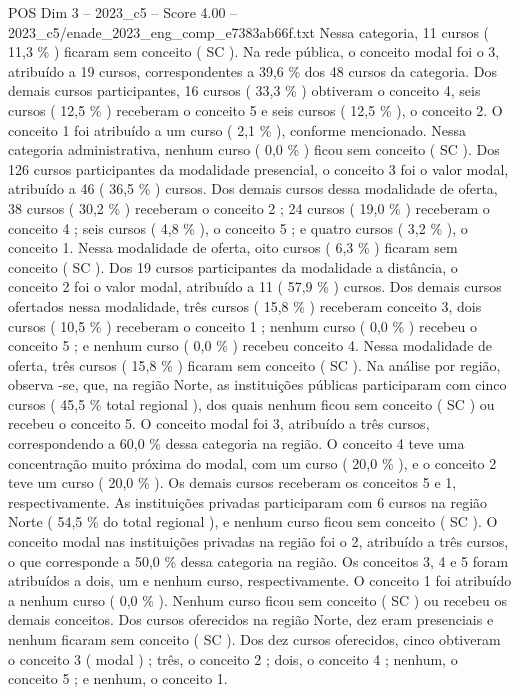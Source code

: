 \begin{textsample}{POS Dim 3 – 2023\_c5 – Score 4.00 – 2023\_c5/enade\_2023\_eng\_comp\_e7383ab66f.txt}
Nessa categoria, 11 cursos ( 11,3 \% ) ficaram sem conceito ( SC ).
Na rede pública, o conceito modal foi o 3, atribuído a 19 cursos, correspondentes a 39,6 \% dos 48 cursos da categoria.
Dos demais cursos participantes, 16 cursos ( 33,3 \% ) obtiveram o conceito 4, seis cursos ( 12,5 \% ) receberam o conceito 5 e seis cursos ( 12,5 \% ), o conceito 2.
O conceito 1 foi atribuído a um curso ( 2,1 \% ), conforme mencionado.
Nessa categoria administrativa, nenhum curso ( 0,0 \% ) ficou sem conceito ( SC ).
Dos 126 cursos participantes da modalidade presencial, o conceito 3 foi o valor modal, atribuído a 46 ( 36,5 \% ) cursos.
Dos demais cursos dessa modalidade de oferta, 38 cursos ( 30,2 \% ) receberam o conceito 2 ; 24 cursos ( 19,0 \% ) receberam o conceito 4 ; seis cursos ( 4,8 \% ), o conceito 5 ; e quatro cursos ( 3,2 \% ), o conceito 1.
Nessa modalidade de oferta, oito cursos ( 6,3 \% ) ficaram sem conceito ( SC ).
Dos 19 cursos participantes da modalidade a distância, o conceito 2 foi o valor modal, atribuído a 11 ( 57,9 \% ) cursos.
Dos demais cursos ofertados nessa modalidade, três cursos ( 15,8 \% ) receberam conceito 3, dois cursos ( 10,5 \% ) receberam o conceito 1 ; nenhum curso ( 0,0 \% ) recebeu o conceito 5 ; e nenhum curso ( 0,0 \% ) recebeu conceito 4.
Nessa modalidade de oferta, três cursos ( 15,8 \% ) ficaram sem conceito ( SC ).
Na análise por região, observa -se, que, na região Norte, as instituições públicas participaram com cinco cursos ( 45,5 \% total regional ), dos quais nenhum ficou sem conceito ( SC ) ou recebeu o conceito 5.
O conceito modal foi 3, atribuído a três cursos, correspondendo a 60,0 \% dessa categoria na região.
O conceito 4 teve uma concentração muito próxima do modal, com um curso ( 20,0 \% ), e o conceito 2 teve um curso ( 20,0 \% ).
Os demais cursos receberam os conceitos 5 e 1, respectivamente.
As instituições privadas participaram com 6 cursos na região Norte ( 54,5 \% do total regional ), e nenhum curso ficou sem conceito ( SC ).
O conceito modal nas instituições privadas na região foi o 2, atribuído a três cursos, o que corresponde a 50,0 \% dessa categoria na região.
Os conceitos 3, 4 e 5 foram atribuídos a dois, um e nenhum curso, respectivamente.
O conceito 1 foi atribuído a nenhum curso ( 0,0 \% ).
Nenhum curso ficou sem conceito ( SC ) ou recebeu os demais conceitos.
Dos cursos oferecidos na região Norte, dez eram presenciais e nenhum ficaram sem conceito ( SC ).
Dos dez cursos oferecidos, cinco obtiveram o conceito 3 ( modal ) ; três, o conceito 2 ; dois, o conceito 4 ; nenhum, o conceito 5 ; e nenhum, o conceito 1.

\end{textsample}
